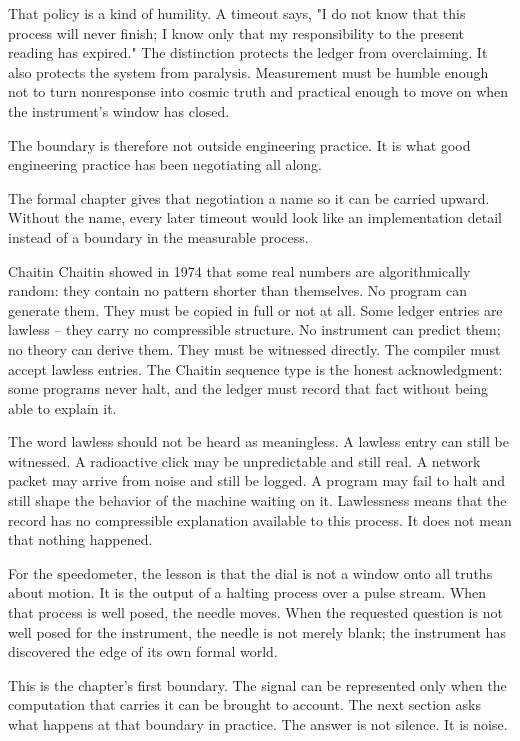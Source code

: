 That policy is a kind of humility. A timeout says, "I do not know that this
process will never finish; I know only that my responsibility to the present
reading has expired." The distinction protects the ledger from overclaiming. It
also protects the system from paralysis. Measurement must be humble enough not
to turn nonresponse into cosmic truth and practical enough to move on when the
instrument's window has closed.

The boundary is therefore not outside engineering practice. It is what good
engineering practice has been negotiating all along.

The formal chapter gives that negotiation a name so it can be carried upward.
Without the name, every later timeout would look like an implementation detail
instead of a boundary in the measurable process.

\begin{gphenom}{Chaitin}
\label{ph:chaitin}
\GPhObs Chaitin showed in 1974 that some real numbers are algorithmically
random: they contain no pattern shorter than themselves. No program can
generate them. They must be copied in full or not at all.
\GPhCon Some ledger entries are lawless -- they carry no compressible
structure. No instrument can predict them; no theory can derive them.
They must be witnessed directly.
\GPhSeq The compiler must accept lawless entries. The Chaitin sequence type is
the honest acknowledgment: some programs never halt, and the ledger must record
that fact without being able to explain it.
\end{gphenom}

The word lawless should not be heard as meaningless. A lawless entry can still
be witnessed. A radioactive click may be unpredictable and still real. A
network packet may arrive from noise and still be logged. A program may fail to
halt and still shape the behavior of the machine waiting on it. Lawlessness
means that the record has no compressible explanation available to this
process. It does not mean that nothing happened.

For the speedometer, the lesson is that the dial is not a window onto all
truths about motion. It is the output of a halting process over a pulse stream.
When that process is well posed, the needle moves. When the requested question
is not well posed for the instrument, the needle is not merely blank; the
instrument has discovered the edge of its own formal world.

This is the chapter's first boundary. The signal can be represented only when
the computation that carries it can be brought to account. The next section
asks what happens at that boundary in practice. The answer is not silence. It
is noise.

